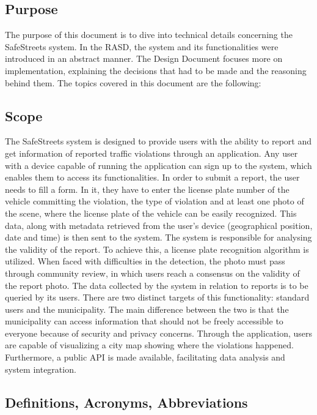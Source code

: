 \subsection{Purpose}

The purpose of this document is to dive into technical details concerning the SafeStreets system. In the RASD, the system and its functionalities were introduced in an abstract manner. The Design Document focuses more on implementation, explaining the decisions that had to be made and the reasoning behind them.
The topics covered in this document are the following:


\subsection{Scope}

The SafeStreets system is designed to provide users with the ability to report and get information of reported traffic violations through an application. 
Any user with a device capable of running the application can sign up to the system, which enables them to access its functionalities.
In order to submit a report, the user needs to fill a form. In it, they have to enter the license plate number of the vehicle committing the violation, the type of violation and at least one photo of the scene, where the license plate of the vehicle can be easily recognized. This data, along with metadata retrieved from the user's device (geographical position, date and time) is then sent to the system.
The system is responsible for analysing the validity of the report. To achieve this, a license plate recognition algorithm is utilized. When faced with difficulties in the detection, the photo must pass through community review, in which users reach a consensus on the validity of the report photo.
The data collected by the system in relation to reports is to be queried by its users. There are two distinct targets of this functionality: standard users and the municipality. The main difference between the two is that the municipality can access information that should not be freely accessible to everyone because of security and privacy concerns. Through the application, users are capable of visualizing a city map showing where the violations happened. Furthermore, a public API is made available, facilitating data analysis and system integration.

\subsection{Definitions, Acronyms, Abbreviations}
